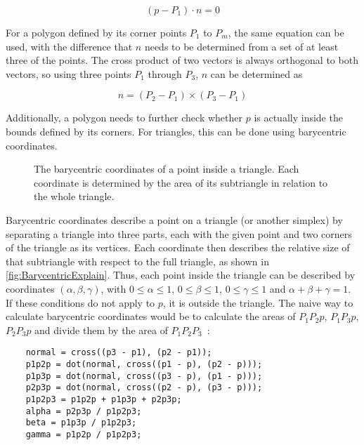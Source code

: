 \begin{equation}\label{StaticSurface}
    (p - P_1) \cdot n = 0
\end{equation}

For a polygon defined by its corner points \(P_{1}\) to \(P_{m}\), the same equation can be used,
with the difference that \(n\) needs to be determined from a set of at least three of the points.
The cross product of two vectors is always orthogonal to both vectors, so using three points \(P_{1}\) through \(P_{3}\),
\(n\) can be determined as

\begin{equation}\label{PolygonNormal}
    n = (P_{2} - P_{1}) \times (P_{3} - P_{1})
\end{equation}

Additionally, a polygon needs to further check whether \(p\) is actually inside the bounds defined by its corners.
For triangles, this can be done using barycentric coordinates.
\newline
\begin{figure}[t!]
    \begin{center}
    
    \end{center}
    \caption{The barycentric coordinates of a point inside a triangle. Each coordinate is determined by the area of its subtriangle in relation to the whole triangle.}\label{fig:BarycentricExplain}
\end{figure}
Barycentric coordinates describe a point on a triangle (or another simplex) by separating a triangle into three parts,
each with the given point and two corners of the triangle as its vertices.
Each coordinate then describes the relative size of that subtriangle with respect to the full triangle,
as shown in \autoref{fig:BarycentricExplain}.
\newline
Thus, each point inside the triangle can be described by coordinates \((\alpha, \beta, \gamma)\),
with \(0 \le \alpha \le 1\), \(0 \le \beta \le 1\), \(0 \le \gamma \le 1\) and \(\alpha + \beta + \gamma = 1\).
If these conditions do not apply to \(p\), it is outside the triangle.
\newline
The naive way to calculate barycentric coordinates would be to calculate the areas of \(P_1P_2p\), \(P_1P_3p\), \(P_2P_3p\) and
divide them by the area of \(P_1P_2P_3\)~\cite{SM09}:
\begin{verbatim}
    normal = cross((p3 - p1), (p2 - p1));
    p1p2p = dot(normal, cross((p1 - p), (p2 - p)));
    p1p3p = dot(normal, cross((p3 - p), (p1 - p)));
    p2p3p = dot(normal, cross((p2 - p), (p3 - p)));
    p1p2p3 = p1p2p + p1p3p + p2p3p;
    alpha = p2p3p / p1p2p3;
    beta = p1p3p / p1p2p3;
    gamma = p1p2p / p1p2p3;
\end{verbatim}
